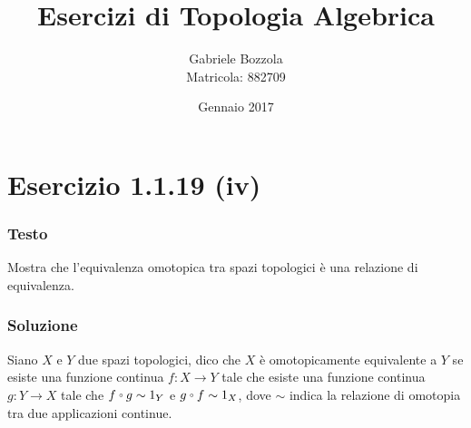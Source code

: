 \documentclass[10pt, toc=sectionentrywithdots]{scrartcl}
\title{Esercizi di Topologia Algebrica}
\author{Gabriele Bozzola \\ Matricola: 882709}
\date{Gennaio 2017}
\let\latexcirc=\circ
\newcommand{\ccirc}{\mathbin{\mathchoice
  {\xcirc\scriptstyle}
  {\xcirc\scriptstyle}
  {\xcirc\scriptscriptstyle}
  {\xcirc\scriptscriptstyle}
}}
\newcommand{\xcirc}[1]{\vcenter{\hbox{$#1\latexcirc$}}}
\let\circ\ccirc
\begin{document}
\maketitle

\renewcommand\contentsname{Esercizi}

\tableofcontents{}


\section[1.1.19 (iv)]{Esercizio 1.1.19 (iv)}

\subsubsection*{Testo}
Mostra che l'equivalenza omotopica tra spazi topologici è una relazione di
equivalenza.

\subsubsection*{Soluzione}
Siano $ X $ e $ Y $ due spazi topologici, dico che $ X $ è
omotopicamente equivalente a $ Y $ se esiste una funzione
continua $ f \colon X \to Y $ tale che esiste una funzione
continua $ g \colon Y \to X $ tale che $ f \circ g \sim 1_{Y} $ e
$ g \circ f \sim 1_{X} $, dove $ \sim $ indica la relazione di
omotopia tra due applicazioni continue.
\end{document}
